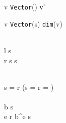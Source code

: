       {\Gamma \vdash v \Rightarrow \texttt{Vector}()}
      {\Gamma \vdash \| v \| \Rightarrow {}}


      {\Gamma \vdash v \Rightarrow \texttt{Vector}(s)}
      {\Gamma \vdash \texttt{dim}(v) \Rightarrow {}}


      { \\ \Gamma \vdash l \Rightarrow s \\ \Gamma \vdash r \Rightarrow s}
      {\Gamma \vdash {} \Rightarrow s}


      { \\ s = r \lor (s =  \land r = ) \\\\%
       \Gamma \vdash b \Rightarrow s \\ \Gamma \vdash e \Rightarrow r}
      {\Gamma \vdash b^e \Rightarrow s}


